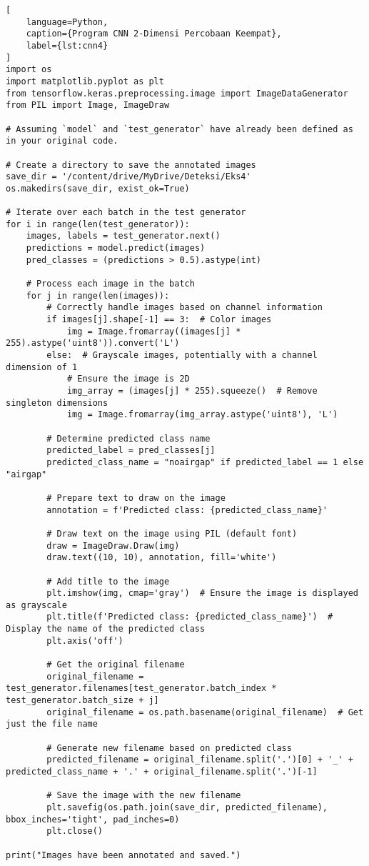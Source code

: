 \begin{lstlisting}[
    language=Python,
    caption={Program CNN 2-Dimensi Percobaan Keempat},
    label={lst:cnn4}
]
import os
import matplotlib.pyplot as plt
from tensorflow.keras.preprocessing.image import ImageDataGenerator
from PIL import Image, ImageDraw

# Assuming `model` and `test_generator` have already been defined as in your original code.

# Create a directory to save the annotated images
save_dir = '/content/drive/MyDrive/Deteksi/Eks4'
os.makedirs(save_dir, exist_ok=True)

# Iterate over each batch in the test generator
for i in range(len(test_generator)):
    images, labels = test_generator.next()
    predictions = model.predict(images)
    pred_classes = (predictions > 0.5).astype(int)

    # Process each image in the batch
    for j in range(len(images)):
        # Correctly handle images based on channel information
        if images[j].shape[-1] == 3:  # Color images
            img = Image.fromarray((images[j] * 255).astype('uint8')).convert('L')
        else:  # Grayscale images, potentially with a channel dimension of 1
            # Ensure the image is 2D
            img_array = (images[j] * 255).squeeze()  # Remove singleton dimensions
            img = Image.fromarray(img_array.astype('uint8'), 'L')

        # Determine predicted class name
        predicted_label = pred_classes[j]
        predicted_class_name = "noairgap" if predicted_label == 1 else "airgap"

        # Prepare text to draw on the image
        annotation = f'Predicted class: {predicted_class_name}'

        # Draw text on the image using PIL (default font)
        draw = ImageDraw.Draw(img)
        draw.text((10, 10), annotation, fill='white')

        # Add title to the image
        plt.imshow(img, cmap='gray')  # Ensure the image is displayed as grayscale
        plt.title(f'Predicted class: {predicted_class_name}')  # Display the name of the predicted class
        plt.axis('off')

        # Get the original filename
        original_filename = test_generator.filenames[test_generator.batch_index * test_generator.batch_size + j]
        original_filename = os.path.basename(original_filename)  # Get just the file name

        # Generate new filename based on predicted class
        predicted_filename = original_filename.split('.')[0] + '_' + predicted_class_name + '.' + original_filename.split('.')[-1]

        # Save the image with the new filename
        plt.savefig(os.path.join(save_dir, predicted_filename), bbox_inches='tight', pad_inches=0)
        plt.close()

print("Images have been annotated and saved.")
\end{lstlisting}


